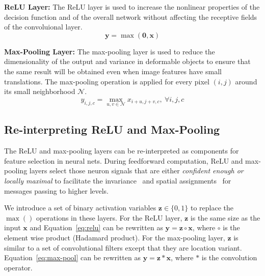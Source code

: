 \textbf{ReLU Layer:}
The ReLU layer is used to increase the nonlinear properties of the decision function and of the overall network without affecting the receptive fields of the convoluional layer.
\begin{equation}
\mathbf{y} = \max (\mathbf{0}, \mathbf{x})
\label{eq:relu}
\end{equation}

\textbf{Max-Pooling Layer:}
The max-pooling layer is used to reduce the dimensionality of the output and variance in deformable objects to ensure that the same result will be obtained even when image features have small translations. The max-pooling operation is applied for every pixel $(i,j)$ around its small neighborhood $\mathcal{N}$.
\begin{equation}
y_{i,j,c} = \max_{u,v \in \mathcal{N}} x_{i+u, j+v, c},\ \forall i, j, c
\label{eq:max-pool}
\end{equation}

\subsection{Re-interpreting ReLU and Max-Pooling}
The ReLU and max-pooling layers can be re-interpreted as components for feature selection in neural nets. During feedforward computation, ReLU and max-pooling layers select those neuron signals that are either \emph{confident enough or locally maximal} to facilitate the invariance~\cite{riesenhuber1999hierarchical} and spatial assignments~\cite{weng1992cresceptron} for messages passing to higher levels.

We introduce a set of binary activation variables $\mathbf{z} \in \{0, 1\}$ to replace the $\max()$ operations in these layers. For the ReLU layer, $\mathbf{z}$ is the same size as the input $\mathbf{x}$ and Equation~\ref{eq:relu} can be rewritten as $\mathbf{y} = \mathbf{z} \circ \mathbf{x}$, where $\circ$ is the element wise product (Hadamard product). For the max-pooling layer, $\mathbf{z}$ is similar to a set of convolutional filters except that they are location variant. Equation~\ref{eq:max-pool} can be rewritten as $\mathbf{y} = \mathbf{z} * \mathbf{x}$, where $*$ is the convolution operator.

